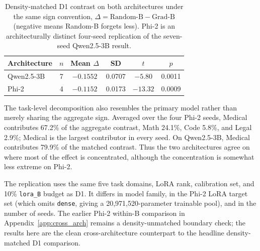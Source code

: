 \begin{table}[t]
\caption{Density-matched D1 contrast on both architectures under the same sign convention, $\Delta=\text{Random-B}-\text{Grad-B}$ (negative means Random-B forgets less). Phi-2 is an architecturally distinct four-seed replication of the seven-seed Qwen2.5-3B result.}
\label{tab:phi2_d1_compare}
\centering
\small
\begin{tabular}{@{}lccccc@{}}
\toprule
\textbf{Architecture} & \textbf{$n$} & \textbf{Mean $\Delta$} & \textbf{SD} & \textbf{$t$} & \textbf{$p$} \\
\midrule
Qwen2.5-3B & 7 & $-0.1552$ & 0.0707 & $-5.80$ & 0.0011 \\
Phi-2      & 4 & $-0.1152$ & 0.0173 & $-13.32$ & 0.0009 \\
\bottomrule
\end{tabular}
\end{table}

The task-level decomposition also resembles the primary model rather than merely sharing the aggregate sign. Averaged over the four Phi-2 seeds, Medical contributes 67.2\% of the aggregate contrast, Math 24.1\%, Code 5.8\%, and Legal 2.9\%; Medical is the largest contributor in every seed. On Qwen2.5-3B, Medical contributes 79.9\% of the matched contrast. Thus the two architectures agree on where most of the effect is concentrated, although the concentration is somewhat less extreme on Phi-2.

The replication uses the same five task domains, LoRA rank, calibration set, and 10\% \texttt{lora\_B} budget as D1. It differs in model family, in the Phi-2 LoRA target set (which omits \texttt{dense}, giving a 20{,}971{,}520-parameter trainable pool), and in the number of seeds. The earlier Phi-2 within-B comparison in Appendix~\ref{app:cross_arch} remains a density-unmatched boundary check; the results here are the clean cross-architecture counterpart to the headline density-matched D1 comparison.

